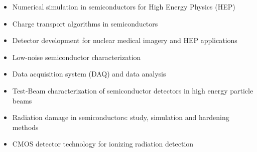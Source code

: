 

\begin{cvparagraph}
\begin{itemize}
    \setlength\itemsep{-0.5em}
    \item Numerical simulation in semiconductors for High Energy Physics (HEP)
    \item Charge transport algorithms in semiconductors 
    \item Detector development for nuclear medical imagery and HEP applications
    \item Low-noise semiconductor characterization 
    \item Data acquisition system (DAQ) and data analysis
    \item Test-Beam characterization of semiconductor detectors in high energy particle beams
    \item Radiation damage in semiconductors: study, simulation and hardening methods
    \item CMOS detector technology for ionizing radiation detection
\end{itemize}
\end{cvparagraph}
